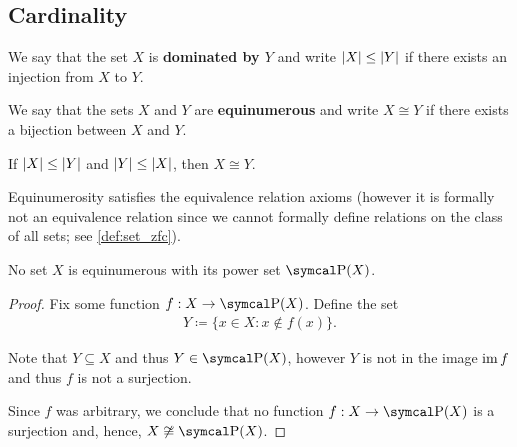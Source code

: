 \subsection{Cardinality}\label{sec:cardinality}

\begin{definition}\label{def:set_domination}\cite[145]{Enderton1977}
  We say that the set \( X \) is \textbf{dominated by \( Y \)} and write \( \left\vert X \right\vert \leq \left\vert Y \right\vert \) if there exists an injection from \( X \) to \( Y \).
\end{definition}

\begin{definition}\label{def:equinumerous_sets}\cite[129]{Enderton1977}
  We say that the sets \( X \) and \( Y \) are \textbf{equinumerous} and write \( X \cong Y \) if there exists a bijection between \( X \) and \( Y \).
\end{definition}

\begin{theorem}\label{thm:cantor_schroder_bernstein}\cite[147]{Enderton1977}
  If \( \left\vert X \right\vert \leq \left\vert Y \right\vert \) and \( \left\vert Y \right\vert \leq \left\vert X \right\vert \), then \( X \cong Y \).
\end{theorem}

\begin{proposition}\label{thm:equinumerousity_equivalence}\cite[theorem 6A]{Enderton1977}
  Equinumerosity satisfies the equivalence relation axioms (however it is formally not an equivalence relation since we cannot formally define relations on the class of all sets; see \cref{def:set_zfc}).
\end{proposition}

\begin{theorem}[Cantor]\label{thm:cantor_power_set_theorem}\cite[theorem 6B]{Enderton1977}
  No set \( X \) is equinumerous with its power set \( \Power(X) \).
\end{theorem}
\begin{proof}
  Fix some function \( f: X \to \Power(X) \). Define the set
  \begin{align*}
    Y \coloneqq \{ x \in X \colon x \not\in f(x) \}.
  \end{align*}

  Note that \( Y \subseteq X \) and thus \( Y \in \Power(X) \), however \( Y \) is not in the image \( \operatorname{im} f \) and thus \( f \) is not a surjection.

  Since \( f \) was arbitrary, we conclude that no function \( f: X \to \Power(X) \) is a surjection and, hence, \( X \not\cong \Power(X) \).
\end{proof}

